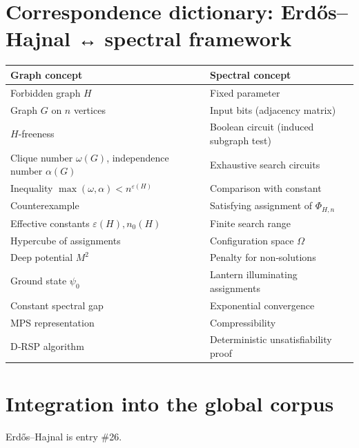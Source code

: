 \documentclass[11pt,a4paper]{article}
\begin{document}
\section{Correspondence dictionary: Erdős–Hajnal ↔ spectral framework}

\begin{center}
\small
\begin{tabular}{@{}l|l@{}}
\toprule
\textbf{Graph concept} & \textbf{Spectral concept} \\
\midrule
Forbidden graph $H$ & Fixed parameter \\
Graph $G$ on $n$ vertices & Input bits (adjacency matrix) \\
$H$-freeness & Boolean circuit (induced subgraph test) \\
Clique number $\omega(G)$, independence number $\alpha(G)$ & Exhaustive search circuits \\
Inequality $\max(\omega,\alpha) < n^{\varepsilon(H)}$ & Comparison with constant \\
Counterexample & Satisfying assignment of $\Phi_{H,n}$ \\
Effective constants $\varepsilon(H), n_0(H)$ & Finite search range \\
Hypercube of assignments & Configuration space $\Omega$ \\
Deep potential $M^2$ & Penalty for non‑solutions \\
Ground state $\psi_0$ & Lantern illuminating assignments \\
Constant spectral gap & Exponential convergence \\
MPS representation & Compressibility \\
D‑RSP algorithm & Deterministic unsatisfiability proof \\
\bottomrule
\end{tabular}
\end{center}

\section{Integration into the global corpus}

Erdős–Hajnal is entry \#26.
\end{document}
